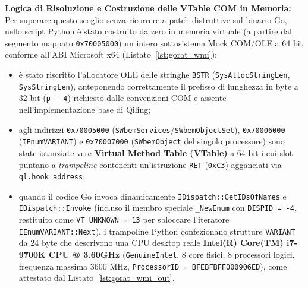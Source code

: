 \documentclass[11pt, a4paper]{article}
\begin{document}
\textbf{Logica di Risoluzione e Costruzione delle VTable COM in Memoria:} Per superare questo scoglio senza ricorrere a patch distruttive sul binario Go, nello script Python \`e stato costruito da zero in memoria virtuale (a partire dal segmento mappato \texttt{0x70005000}) un intero sottosistema Mock COM/OLE a 64 bit conforme all'ABI Microsoft x64 (Listato~\ref{lst:gorat_wmi}):
\begin{itemize}
	\item \`e stato riscritto l'allocatore OLE delle stringhe \texttt{BSTR} (\texttt{Sys\allowbreak{}Alloc\allowbreak{}String\allowbreak{}Len}, \texttt{SysStringLen}), anteponendo correttamente il prefisso di lunghezza in byte a 32 bit (\texttt{p - 4}) richiesto dalle convenzioni COM e assente nell'implementazione base di Qiling;
	\item agli indirizzi \texttt{0x70005000} (\texttt{SWbem\allowbreak{}Services}/\texttt{SWbem\allowbreak{}Object\allowbreak{}Set}), \texttt{0x70006000} (\texttt{IEnumVARIANT}) e \texttt{0x70007000} (\texttt{SWbemObject} del singolo processore) sono state istanziate vere \textbf{Virtual Method Table (VTable)} a 64 bit i cui slot puntano a \textit{trampoline} contenenti un'istruzione \texttt{RET} (\texttt{0xC3}) agganciati via \texttt{ql.\allowbreak{}hook\_\allowbreak{}address};
	\item quando il codice Go invoca dinamicamente \texttt{IDispatch::\allowbreak{}GetIDs\allowbreak{}Of\allowbreak{}Names} e \texttt{IDispatch::\allowbreak{}Invoke} (incluso il membro speciale \texttt{\_NewEnum} con \texttt{DISPID = -4}, restituito come \texttt{VT\_\allowbreak{}UNKNOWN = 13} per sbloccare l'iteratore \texttt{IEnumVARIANT::\allowbreak{}Next}), i trampoline Python confezionano strutture \texttt{VARIANT} da 24 byte che descrivono una CPU desktop reale \textbf{Intel(R) Core(TM) i7-9700K CPU @ 3.60GHz} (\texttt{GenuineIntel}, 8 core fisici, 8 processori logici, frequenza massima 3600 MHz, \texttt{ProcessorID = BFEBFBFF000906ED}), come attestato dal Listato~\ref{lst:gorat_wmi_out}.
\end{itemize}
\end{document}
